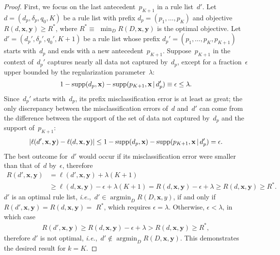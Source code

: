 \documentclass[twoside,11pt]{article}
\def\ie{{\it i.e.},~}
\newcommand{\x}{\mathbf{x}}
\newcommand{\y}{\mathbf{y}}
\def\RL{{d}}
\def\Prefix{d_p}
\def\Labels{\delta_p}
\def\Default{q_0}
\def\RLB{{D}}
\def\Obj{R}
\def\Loss{\ell}
\def\Reg{{\lambda}}
\def\Supp{\textnormal{supp}}
\def\OptimalObj{R^*}
\DeclareMathOperator*{\argmin}{argmin}
\newcommand{\given}{\,|\,}
\begin{document}
\begin{proof}
First, we focus on the last antecedent~$p_{K+1}$ in a rule list~$\RL'$.
%
Let ${\RL = (\Prefix, \Labels, \Default, K)}$
be a rule list with prefix ${\Prefix = (p_1, \dots, p_K)}$
and objective ${\Obj(\RL, \x, \y) \ge \OptimalObj}$, where
${\OptimalObj \equiv}$ ${\min_{\RLB} \Obj(\RLB, \x, \y)}$
is the optimal objective.
%
Let ${\RL' = (\Prefix', \Labels', \Default', K + 1)}$
be a rule list whose prefix ${\Prefix' = (p_1, \dots, p_K, p_{K+1})}$
starts with~$\Prefix$ and ends with a new antecedent~$p_{K+1}$.
%
Suppose~$p_{K+1}$ in the context of~$\Prefix'$ captures nearly all
data not captured by~$\Prefix$, except for a fraction~$\epsilon$
upper bounded by the regularization parameter~$\Reg$:
\begin{align*}
1 - \Supp(\Prefix, \x) - \Supp(p_{K+1}, \x \given \Prefix') \equiv \epsilon \le \Reg.
\end{align*}
%
Since~$\Prefix'$ starts with~$\Prefix$,
its prefix misclassification error is at least as great;
the only discrepancy between the misclassification errors
of~$\RL$ and~$\RL'$ can come from the difference between the support of
the set of data not captured by~$\Prefix$ and the support of~$p_{K+1}$:
\begin{align*}
| \Loss(\RL', \x, \y) - \Loss(\RL, \x, \y) | \le
1 - \Supp(\Prefix, \x) - \Supp(p_{K+1}, \x \given \Prefix') = \epsilon.
\end{align*}
The best outcome for~$\RL'$ would occur if its misclassification
error were smaller than that of~$\RL$ by~$\epsilon$, therefore
\begin{align*}
\Obj(\RL', \x, \y) &= \Loss(\RL', \x, \y) + \Reg (K+1) \\
&\ge \Loss(\RL, \x, \y) - \epsilon + \Reg(K+1)
= \Obj(\RL, \x, \y) - \epsilon + \Reg \ge \Obj(\RL, \x, \y) \ge \OptimalObj.
\end{align*}
$\RL'$ is an optimal rule list,
\ie ${\RL' \in \argmin_{\RLB} \Obj(\RLB, \x, y)}$,
if and only if ${\Obj(\RL', \x, \y) = \Obj(\RL, \x, \y) =}$ ${\OptimalObj}$,
which requires ${\epsilon = \Reg}$.
%
Otherwise, ${\epsilon < \Reg}$, in which case
\begin{align*}
\Obj(\RL', \x, \y) \ge \Obj(\RL, \x, \y) - \epsilon + \Reg
> \Obj(\RL, \x, \y) \ge \OptimalObj,
\end{align*}
therefore $\RL'$ is not optimal, \ie  ${\RL' \notin \argmin_{\RLB} \Obj(\RLB, \x, \y)}$.
%
This demonstrates the desired result for ${k = K}$.


\end{proof}
\end{document}
